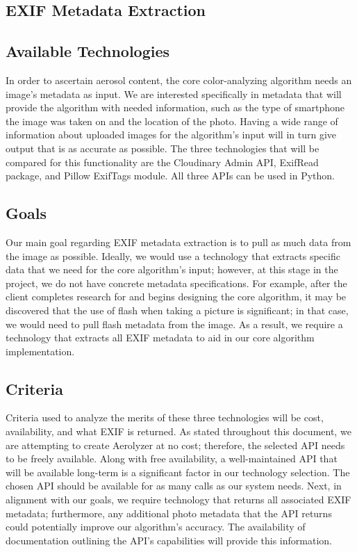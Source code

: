 \documentclass[letterpaper,10pt,draftclsnofoot,onecolumn]{IEEEtran}
\begin{document}
\begin{flushleft}
\section{EXIF Metadata Extraction}
\subsection{Available Technologies}
In order to ascertain aerosol content, the core color-analyzing algorithm needs an image's metadata as input. We are interested specifically in metadata that will provide the algorithm with needed information, such as the type of smartphone the image was taken on and the location of the photo. Having a wide range of information about uploaded images for the algorithm's input will in turn give output that is as accurate as possible. The three technologies that will be compared for this functionality are the Cloudinary Admin API, ExifRead package, and Pillow ExifTags module. All three APIs can be used in Python. \cite{22} \cite{23} \cite{24}

\subsection{Goals}
Our main goal regarding EXIF metadata extraction is to pull as much data from the image as possible. Ideally, we would use a technology that extracts specific data that we need for the core algorithm's input; however, at this stage in the project, we do not have concrete metadata specifications. For example, after the client completes research for and begins designing the core algorithm, it may be discovered that the use of flash when taking a picture is significant; in that case, we would need to pull flash metadata from the image. As a result, we require a technology that extracts all EXIF metadata to aid in our core algorithm implementation.

\subsection{Criteria}
Criteria used to analyze the merits of these three technologies will be cost, availability, and what EXIF is returned. As stated throughout this document, we are attempting to create Aerolyzer at no cost; therefore, the selected API needs to be freely available. Along with free availability, a well-maintained API that will be available long-term is a significant factor in our technology selection. The chosen API should be available for as many calls as our system needs. Next, in alignment with our goals, we require technology that returns all associated EXIF metadata; furthermore, any additional photo metadata that the API returns could potentially improve our algorithm's accuracy. The availability of documentation outlining the API's capabilities will provide this information. 


\end{flushleft}
\end{document}
